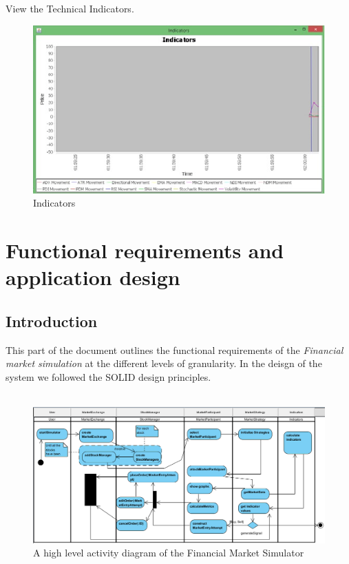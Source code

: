 \documentclass[12pt]{article}
\begin{document}
        View the Technical Indicators.

	\begin{figure}[h!]
	\centering
	\includegraphics[scale=0.8]{./indicators}
	\caption{Indicators}
	\label{Indicators}
	\end{figure}
            
\newpage
	\section{Functional requirements and application design}
		\subsection{Introduction}	
		This part of the document outlines the functional requirements of the \textit{Financial market simulation} at the different levels of granularity. In the deisgn of the system we followed the SOLID design principles.\\ \\ 
		
			\begin{figure}[th]
			\centering
			\includegraphics[scale=0.6]{./activity}
			\caption{A high level activity diagram of the Financial Market Simulator}
			\label{domain objects}
			\end{figure}
		\pagebreak			    
\end{document}
